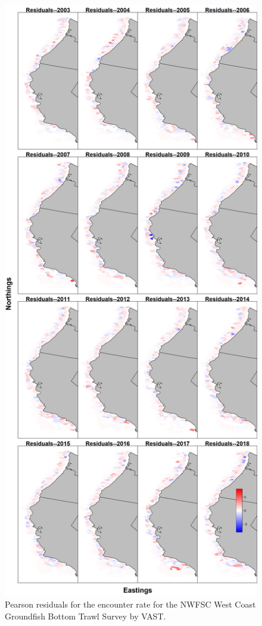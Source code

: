 \documentclass[12pt,]{article}
\begin{document}
\FloatBarrier

\begin{figure}
\centering
\includegraphics{Figures/nwfsc_maps--encounter_pearson_resid.png}
\caption{Pearson residuals for the encounter rate for the NWFSC West
Coast Groundfish Bottom Trawl Survey by VAST. \label{fig:nw_enc_rate}}
\end{figure}
\end{document}
